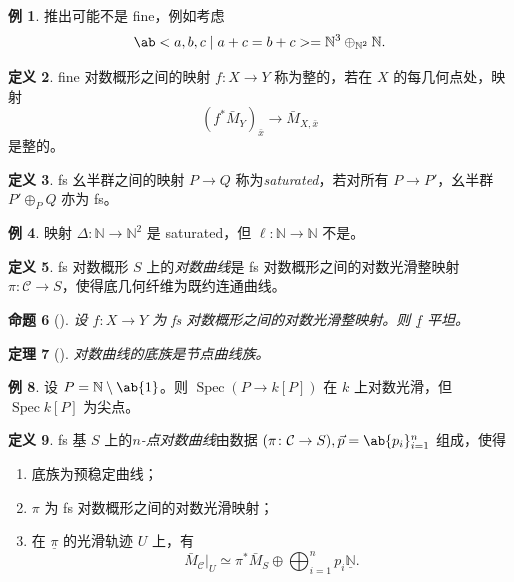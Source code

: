 \documentclass{amsart}
\newtheorem{thm}{定理}[section]
\newtheorem{prop}[thm]{命题}
\theoremstyle{definition}
\newtheorem{defn}[thm]{定义}
\newtheorem{exm}[thm]{例}
\theoremstyle{remark}
\theoremstyle{plain}
\theoremstyle{definition}
\theoremstyle{remark}
\newcommand{\N}{\mathbb{N}}
\newcommand{\mc}[1]{\mathcal{#1}}
\newcommand{\ul}[1]{\underline{#1}}
\newcommand{\1}{\mathbf{1}}
\newcommand{\2}{\mathbf{2}}
\newcommand{\3}{\mathbf{3}}
\DeclareMathOperator{\Spec}{Spec}
\begin{document}
\begin{exm}
    推出可能不是 fine，例如考虑
    \[ \ab< a ,b,c \mid a+c=b+c> = \N^3 \oplus_{\N^2} \N. \]
\end{exm}

\begin{defn}
    fine 对数概形之间的映射 \(f \colon X \to Y\) 称为整的，若在 \(X\) 的每几何点处，映射
    \[ (f^*\bar{M}_Y)_{\bar{x}} \to \bar{M}_{X,\bar{x}} \]
    是整的。
\end{defn}

\begin{defn}
    fs 幺半群之间的映射 \(P \to Q\) 称为\textit{saturated}，若对所有 \(P \to P'\)，幺半群 \(P' \oplus_P Q\) 亦为 fs。
\end{defn}

\begin{exm}
    映射 \(\Delta \colon \N \to \N^2\) 是 saturated，但 \(\ell \colon \N \to \N\) 不是。
\end{exm}

\begin{defn}
    fs 对数概形 \(S\) 上的\textit{对数曲线}是 fs 对数概形之间的对数光滑整映射 \(\pi \colon \mc{C} \to S\)，使得底几何纤维为既约连通曲线。
\end{defn}

\begin{prop}[{\cite{Kato1989}}]
    设 \(f \colon X \to Y\) 为 fs 对数概形之间的对数光滑整映射。则 \(\ul{f}\) 平坦。
\end{prop}

\begin{thm}[{\cite{FKato2000}}]
    对数曲线的底族是节点曲线族。
\end{thm}

\begin{exm}
    设 \(P = \N \setminus \ab\{1\}\)。则 \(\Spec (P \to k[P])\) 在 \(k\) 上对数光滑，但 \(\Spec k[P]\) 为尖点。
\end{exm}

\begin{defn}
    fs 基 \(S\) 上的\textit{\(n\)-点对数曲线}由数据 \((\pi \colon \mc{C} \to S), \vec{p} = \ab\{p_i\}_{i=1}^n\) 组成，使得
    \begin{enumerate}
        \item 底族为预稳定曲线；
        \item \(\pi\) 为 fs 对数概形之间的对数光滑映射；
        \item 在 \(\ul{\pi}\) 的光滑轨迹 \(U\) 上，有
            \[ \bar{M}_{\mc{C}}|_U \simeq \pi^* \bar{M}_S \oplus \bigoplus_{i=1}^n p_i \ul{\N}. \]
    \end{enumerate}
\end{defn}
\end{document}
